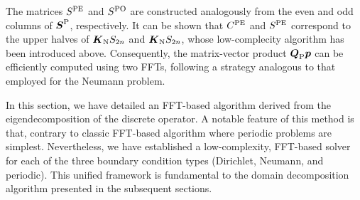\documentclass[preprint]{elsarticle}
\begin{document}
The matrices $S^{\rm PE}$ and $S^{\rm PO}$ are constructed analogously from the even and odd columns of $\boldsymbol{S}^{\rm P}$, respectively. It can be shown that $C^{\rm PE}$ and $S^{\rm PE}$ correspond to the upper halves of $\boldsymbol{K}_{\rm N}S_{2n}$ and $\boldsymbol{K}_{\rm N}S_{2n}$, whose low-complecity algorithm has been introduced above. Consequently, the matrix-vector product $\boldsymbol{Q}_{\rm P}\boldsymbol{p}$ can be efficiently computed using two FFTs, following a strategy analogous to that employed for the Neumann problem.

In this section, we have detailed an FFT-based algorithm derived from the eigendecomposition of the discrete operator. A notable feature of this method is that, contrary to classic FFT-based algorithm where periodic problems are simplest. Nevertheless, we have established a low-complexity, FFT-based solver for each of the three boundary condition types (Dirichlet, Neumann, and periodic). This unified framework is fundamental to the domain decomposition algorithm presented in the subsequent sections.

\end{document}
